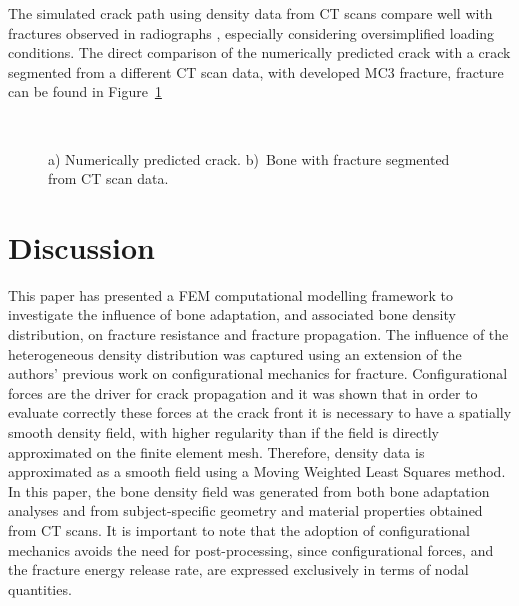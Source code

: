 \documentclass[twocolumn]{svjour3}
\begin{document}
The simulated crack path using density data from CT scans compare well with fractures observed in radiographs \cite{whitton2010third}, especially considering oversimplified loading conditions. The direct comparison of the numerically predicted crack with a crack segmented from a different CT scan data, with developed MC3 fracture, fracture can be found in Figure~\ref{fig:real_fractures}
% 
\begin{figure}
	\centering
	 \\%
	\caption{a) Numerically predicted crack. b)~Bone with fracture segmented from CT scan data. }
\label{fig:real_fractures}
\end{figure}


\section{Discussion}\label{sec:discussion}
This paper has presented a FEM computational modelling framework to investigate the influence of bone adaptation, and associated bone density distribution, on fracture resistance and fracture propagation. 
The influence of the heterogeneous density distribution was captured using an extension of the authors' previous work on configurational mechanics for fracture. 
Configurational forces are the driver for crack propagation and it was shown that in order to evaluate correctly these forces at the crack front it is necessary to have a spatially smooth density field, with higher regularity than if the field is directly approximated on the finite element mesh. 
Therefore, density data is approximated as a smooth field using a Moving Weighted Least Squares method. 
In this paper, the bone density field was generated from both bone adaptation analyses and from subject-specific geometry and material properties obtained from CT scans. 
It is important to note that the adoption of configurational mechanics avoids the need for post-processing, since configurational forces, and the fracture energy release rate, are expressed exclusively in terms of nodal quantities.
\end{document}
